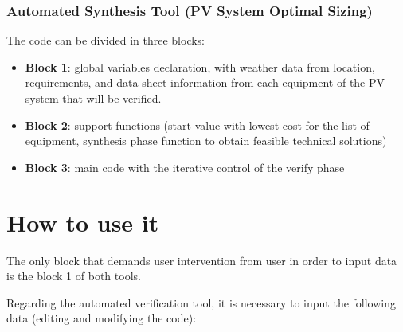 \subsubsection{Automated Synthesis Tool (PV System Optimal Sizing)}

The code can be divided in three blocks:

\begin{itemize}
\item \textbf{Block 1}: global variables declaration, with weather data from location, requirements, and data sheet information from each equipment of the PV system that will be verified. 

\item \textbf{Block 2}: support functions (start value with lowest cost for the list of equipment, synthesis phase function to obtain feasible technical solutions)

\item \textbf{Block 3}: main code with the iterative control of the verify phase
\end{itemize}

\section{How to use it}
The only block that demands user intervention from user in order to input data is the block 1 of both tools.

Regarding the automated verification tool, it is necessary to input the following data (editing and modifying the code):

